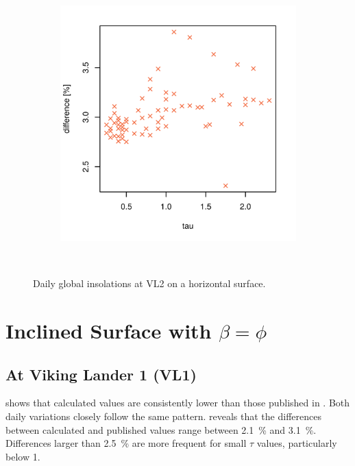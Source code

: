 \begin{figure}[h]
\begin{subfigure}[t]{\subfigureWidth}
            \includegraphics[height=\graphicsHeight]{sections/appendix/insolation-calculation-verification/plots/hh-diff-bet-exp-calc-at-vl2.png}
            \label{fig:sub:comparative-global-insolation-at-vl2-horizontal-percentage-differences}
    \end{subfigure}\\[0.8ex]
    \caption[Daily global insolations at Viking Lander 2 on a horizontal surface]
    {Daily global insolations at \ac{VL2} on a horizontal surface.}
    \label{fig:plot:comparative-global-insolation-at-vl2-horizontal}
\vspace{-2ex}
\end{figure}

\section{Inclined Surface with $\beta=\phi$}
\subsection{At Viking Lander 1 (VL1)}
 shows that calculated values are consistently lower than those published in . Both daily variations closely follow the same pattern.  reveals that the differences between calculated and published values range between \SI{2.1}{\percent} and \SI{3.1}{\percent}. Differences larger than \SI{2.5}{\percent} are more frequent for small $\tau$ values, particularly below 1.


